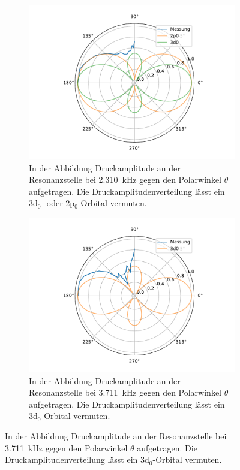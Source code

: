             \begin{figure}[ht]
                \centering
                \begin{subfigure}[b]{0.45\textwidth}
                    \centering
                    \includegraphics[scale=0.3]{./pictures/H_atom_resonanz_1_2310Hz.pdf}
                    \caption{In der Abbildung Druckamplitude an der Resonanzstelle bei \SI{2.310}{\kilo\hertz} gegen den Polarwinkel $\theta$ aufgetragen. Die Druckamplitudenverteilung lässt ein 3d$_0$- oder 2p$_0$-Orbital vermuten.}
                    \label{fig:H_atom_resonanz_1_2310Hz}
                \end{subfigure}
                \hfill
                \centering
                \begin{subfigure}[b]{0.45\textwidth}
                    \centering
                    \includegraphics[scale=0.3]{./pictures/H_atom_resonanz_2_3711Hz.pdf}
                    \caption{In der Abbildung Druckamplitude an der Resonanzstelle bei \SI{3.711}{\kilo\hertz} gegen den Polarwinkel $\theta$ aufgetragen. Die Druckamplitudenverteilung lässt ein 3d$_0$-Orbital vermuten.}
                    \label{fig:H_atom_resonanz_2_3711Hz}
                \end{subfigure}
            \end{figure}

